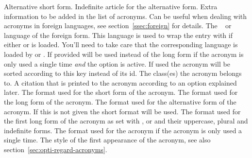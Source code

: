 \documentclass[load-preamble+]{cnltx-doc}
\begin{document}
\begin{options}
    Alternative short form.
    Indefinite article for the alternative form.
    Extra information to be added in the list of acronyms.
    Can be useful when dealing with acronyms in foreign languages, see
    section~\vref{ssec:foreign} for details.
    The ~\cite{pkg:babel} or
    ~\cite{pkg:polyglossia} language of the foreign form.
    This language is used to wrap the entry with
     if either  or
     is loaded.  You'll need to take care that the
    corresponding language is loaded by  or .
    If provided  will be used instead of the long
    form if the acronym is only used a single time \emph{and} the option
     is active.
    If used the acronym will be sorted according to this key instead of its
    \acs{id}.
    The class(es) the acronym belongs to.
    A citation that is printed to the acronym according to an option explained
    later.
    The format used for the short form of the acronym.
    The format used for the long form of the acronym.
    The format used for the alternative form of the
    acronym. If this is not given the short format will be used.
    The format used for the first long form of the acronym as set with ,
     or  and their uppercase, plural and indefinite forms.
    The format used for the acronym if the acronym is only
    used a single time.
    The style of the first appearance of the acronym, see
    also section~\ref{sec:opti-regard-acronyms}.

\end{options}
\end{document}
